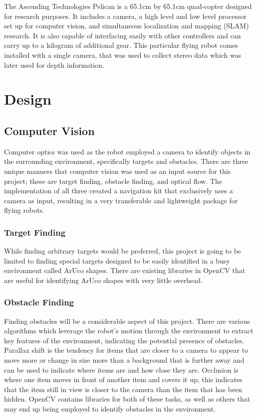 \documentclass{article}[12]
\begin{document}
		The Ascending Technologies Pelican is a 65.1cm by 65.1cm quad-copter designed for research purposes\cite{asctec}. It includes a camera, a high level and low level processor set up for computer vision, and simultaneous localization and mapping (SLAM) research. It is also capable of interfacing easily with other controllers and can carry up to a kilogram of additional gear. This particular flying robot comes installed with a single camera, that was used to collect stereo data which was later used for depth information.

		
\section{Design}
	
	\subsection{Computer Vision}
	
	Computer optics was used as the robot employed a camera to identify objects in the surrounding environment, specifically targets and obstacles. There are three unique manners that computer vision was used as an input source for this project; these are target finding, obstacle finding, and optical flow. The implementation of all three created a navigation kit that exclusively uses a camera as input, resulting in a very transferable and lightweight package for flying robots.
	
		\subsubsection{Target Finding}
		
		While finding arbitrary targets would be preferred, this project is going to be limited to finding special targets designed to be easily identified in a busy environment called ArUco shapes. There are existing libraries in OpenCV that are useful for identifying ArUco shapes with very little overhead. 
		
		\subsubsection{Obstacle Finding}
		
		Finding obstacles will be a considerable aspect of this project. There are various algorithms which leverage the robot's motion through the environment to extract key features of the environment, indicating the potential presence of obstacles. Parallax shift is the tendency for items that are closer to a camera to appear to move more or change in size more than a background that is further away and can be used to indicate where items are and how close they are. Occlusion is where one item moves in front of another item and covers it up, this indicates that the item still in view is closer to the camera than the item that has been hidden. OpenCV contains libraries for both of these tasks, as well as others that may end up being employed to identify obstacles in the environment.
		
\end{document}

